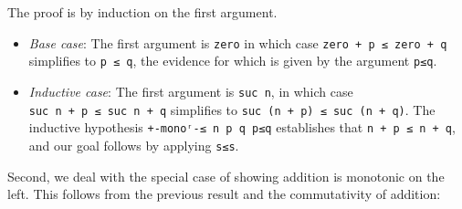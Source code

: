 The proof is by induction on the first argument.

\begin{itemize}
\item
  \emph{Base case}: The first argument is \texttt{zero} in which case
  \texttt{zero\ +\ p\ ≤\ zero\ +\ q} simplifies to \texttt{p\ ≤\ q}, the
  evidence for which is given by the argument \texttt{p≤q}.
\item
  \emph{Inductive case}: The first argument is \texttt{suc\ n}, in which
  case \texttt{suc\ n\ +\ p\ ≤\ suc\ n\ +\ q} simplifies to
  \texttt{suc\ (n\ +\ p)\ ≤\ suc\ (n\ +\ q)}. The inductive hypothesis
  \texttt{+-monoʳ-≤\ n\ p\ q\ p≤q} establishes that
  \texttt{n\ +\ p\ ≤\ n\ +\ q}, and our goal follows by applying
  \texttt{s≤s}.
\end{itemize}

Second, we deal with the special case of showing addition is monotonic
on the left. This follows from the previous result and the commutativity
of addition:

\begin{fence}
\begin{code}%
\>[0]\AgdaSpace{}%
\AgdaSymbol{:}\AgdaSpace{}%
\AgdaSpace{}%
\AgdaSymbol{(}\AgdaSpace{}%
\AgdaSpace{}%
\AgdaSpace{}%
\AgdaSymbol{:}\AgdaSpace{}%
\AgdaSymbol{)}\<%
\\
\>[0][@{}l@{\AgdaIndent{0}}]%
\>[2]%
\>[448I]\AgdaSpace{}%
\AgdaSpace{}%
\<%
\\
\>[.][@{}l@{}]\<[448I]%
\>[4]\AgdaComment{-------------}\<%
\\
%
\>[2]\AgdaSpace{}%
\AgdaSpace{}%
\AgdaOperator{\AgdaPrimitive{+}}\AgdaSpace{}%
\AgdaSpace{}%
\AgdaSpace{}%
\AgdaSpace{}%
\AgdaOperator{\AgdaPrimitive{+}}\AgdaSpace{}%
\<%
\\
\>[0]\AgdaSpace{}%
\AgdaSpace{}%
\AgdaSpace{}%
\AgdaSpace{}%
%
\>[21]\AgdaSpace{}%
\AgdaSpace{}%
\AgdaSpace{}%
\AgdaSpace{}%
\AgdaSymbol{|}\AgdaSpace{}%
\AgdaSpace{}%
\AgdaSpace{}%
%
\>[54]\AgdaSymbol{=}\AgdaSpace{}%
\AgdaSpace{}%
\AgdaSpace{}%
\AgdaSpace{}%
\AgdaSpace{}%
\<%
\end{code}
\end{fence}

